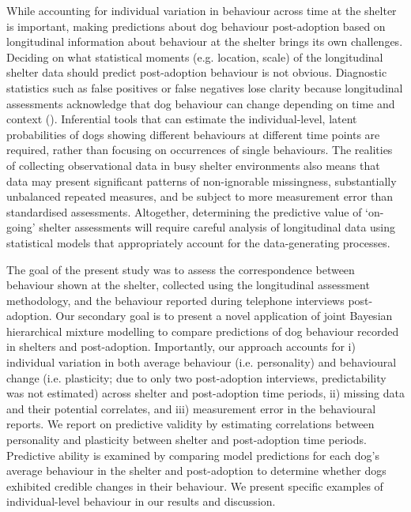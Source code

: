 \documentclass[12pt]{article}
\begin{document}
While accounting for individual variation in behaviour across time at the shelter is important, making predictions about dog behaviour post-adoption based on longitudinal information about behaviour at the shelter brings its own challenges. Deciding on what statistical moments (e.g. location, scale) of the longitudinal shelter data should predict post-adoption behaviour is not obvious. Diagnostic statistics such as false positives or false negatives lose clarity because longitudinal assessments acknowledge that dog behaviour can change depending on time and context (\cite{goold2017modelling}). Inferential tools that can estimate the individual-level, latent probabilities of dogs showing different behaviours at different time points are required, rather than focusing on occurrences of single behaviours. The realities of collecting observational data in busy shelter environments also means that data may present significant patterns of non-ignorable missingness, substantially unbalanced repeated measures, and be subject to more measurement error than standardised assessments. Altogether, determining the predictive value of `on-going' shelter assessments will require careful analysis of longitudinal data using statistical models that appropriately account for the data-generating processes.

The goal of the present study was to assess the correspondence between behaviour shown at the shelter, collected using the longitudinal assessment methodology, and the behaviour reported during telephone interviews post-adoption. Our secondary goal is to present a novel application of joint Bayesian hierarchical mixture modelling to compare predictions of dog behaviour recorded in shelters and post-adoption. Importantly, our approach accounts for i) individual variation in both average behaviour (i.e. personality) and behavioural change (i.e. plasticity; due to only two post-adoption interviews, predictability was not estimated) across shelter and post-adoption time periods, ii) missing data and their potential correlates, and iii) measurement error in the behavioural reports. We report on predictive validity by estimating correlations between personality and plasticity between shelter and post-adoption time periods. Predictive ability is examined by comparing model predictions for each dog's average behaviour in the shelter and post-adoption to determine whether dogs exhibited credible changes in their behaviour. We present specific examples of individual-level behaviour in our results and discussion.
\end{document}
